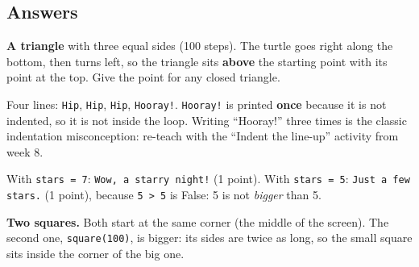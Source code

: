 \subsection{Answers}
\begin{answer}
\begin{description}[leftmargin=0pt,itemsep=3pt,font=\bfseries]
  \item[A1 (G9, G2).] \textbf{A triangle} with three equal sides (100 steps). The turtle goes right along the bottom,
    then turns left, so the triangle sits \textbf{above} the starting point with its point at the top.
    Give the point for any closed triangle.
  \item[A2 (G9, G2).] Four lines: \texttt{Hip}, \texttt{Hip}, \texttt{Hip}, \texttt{Hooray!}. \texttt{Hooray!} is printed
    \textbf{once} because it is not indented, so it is not inside the loop. Writing \enquote{Hooray!} three times is
    the classic indentation misconception: re-teach with the \enquote{Indent the line-up} activity from week 8.
  \item[A3 (G3, G4), 2 points.] With \texttt{stars = 7}: \texttt{Wow, a starry night!} (1 point).
    With \texttt{stars = 5}: \texttt{Just a few stars.} (1 point), because \texttt{5 > 5} is False: 5 is not
    \emph{bigger} than 5.
  \item[A4 (G5).] \textbf{Two squares.} Both start at the same corner (the middle of the screen). The second one,
    \texttt{square(100)}, is bigger: its sides are twice as long, so the small square sits inside the corner of the big one.
\end{description}
\end{answer}

